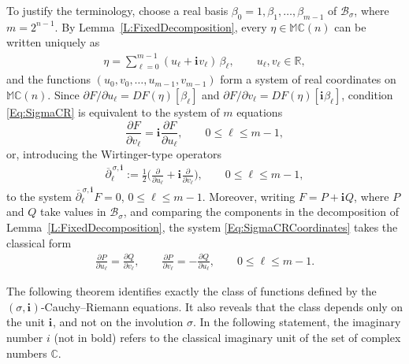 \documentclass[12pt]{amsart}
\theoremstyle{plain}
\theoremstyle{definition}
\numberwithin{equation}{section}
\newcommand{\im}[1]{\mathbf{ i_{#1}}}
\newcommand{\mC}{\mathbb{C}}
\newcommand{\mR}{\mathbb{R}}
\newcommand{\mM}{\mathbb{M}}
\newcommand{\cB}{\mathcal{B}}
\begin{document}
To justify the terminology, choose a real basis $\beta_0 = 1 , \beta_1 , \ldots , \beta_{m - 1}$ of $\cB_\sigma$, where $m = 2^{n-1}$. By Lemma~\ref{L:FixedDecomposition}, every $\eta \in \mM \mC(n)$ can be written uniquely as
    \begin{align*}
    \eta = \sum_{\ell = 0}^{m-1} ( u_\ell + \im{} v_\ell )\, \beta_\ell , \qquad u_\ell , v_\ell \in \mR,
    \end{align*}
and the functions $(u_0, v_0 , \ldots , u_{m-1}, v_{m-1})$ form a system of real coordinates on $\mM \mC(n)$. Since $\partial F / \partial u_\ell = DF (\eta ) [\beta_\ell]$ and $\partial F / \partial v_\ell = DF (\eta ) [\im{} \beta_\ell]$, condition \eqref{Eq:SigmaCR} is equivalent to the system of $m$ equations
    \begin{equation}\label{Eq:SigmaCRCoordinates}
    \frac{\partial F}{\partial v_\ell} = \im{} \frac{\partial F}{\partial u_\ell} , \qquad 0 \leq \ell \leq m - 1,
    \end{equation}
or, introducing the Wirtinger-type operators
    \begin{align*}
    \overline{\partial}_\ell^{\, \sigma , \im{}} := \frac{1}{2} \Big( \frac{\partial}{\partial u_\ell} + \im{} \frac{\partial}{\partial v_\ell} \Big) , \qquad 0 \leq \ell \leq m -1,
    \end{align*}
to the system $\overline{\partial}_\ell^{\, \sigma , \im{}} F = 0$, $0 \leq \ell \leq m - 1$. Moreover, writing $F = P + \im{} Q$, where $P$ and $Q$ take values in $\cB_\sigma$, and comparing the components in the decomposition of Lemma~\ref{L:FixedDecomposition}, the system \eqref{Eq:SigmaCRCoordinates} takes the classical form
    \begin{align*}
    \frac{\partial P}{\partial u_\ell} = \frac{\partial Q}{\partial v_\ell} , \qquad \frac{\partial P}{\partial v_\ell} = - \frac{\partial Q}{\partial u_\ell}, \qquad 0 \leq \ell \leq m - 1.
    \end{align*}

The following theorem identifies exactly the class of functions defined by the $(\sigma , \im{})$-Cauchy--Riemann equations. It also reveals that the class depends only on the unit $\im{}$, and not on the involution $\sigma$. In the following statement, the imaginary number $i$ (not in bold) refers to the classical imaginary unit of the set of complex numbers $\mC$. 
\end{document}
